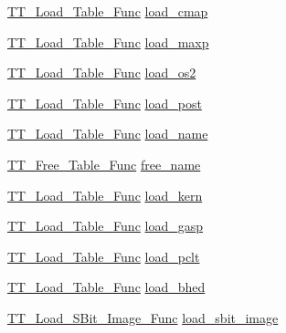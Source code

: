 \begin{DoxyCompactItemize}
\item 
\hyperlink{sfnt_8h_a91c8b8234760c9e3208e37c15cf1663c}{T\-T\-\_\-\-Load\-\_\-\-Table\-\_\-\-Func} \hyperlink{struct_s_f_n_t___interface___a3390e643937228ada5f1097c5598b851}{load\-\_\-cmap}
\item 
\hyperlink{sfnt_8h_a91c8b8234760c9e3208e37c15cf1663c}{T\-T\-\_\-\-Load\-\_\-\-Table\-\_\-\-Func} \hyperlink{struct_s_f_n_t___interface___a399c84ff5f64ebe022b0de02b474605f}{load\-\_\-maxp}
\item 
\hyperlink{sfnt_8h_a91c8b8234760c9e3208e37c15cf1663c}{T\-T\-\_\-\-Load\-\_\-\-Table\-\_\-\-Func} \hyperlink{struct_s_f_n_t___interface___a8976abd388072452e40dc7669c4882e2}{load\-\_\-os2}
\item 
\hyperlink{sfnt_8h_a91c8b8234760c9e3208e37c15cf1663c}{T\-T\-\_\-\-Load\-\_\-\-Table\-\_\-\-Func} \hyperlink{struct_s_f_n_t___interface___a9781e592014f8f3b55e5035ddadb0492}{load\-\_\-post}
\item 
\hyperlink{sfnt_8h_a91c8b8234760c9e3208e37c15cf1663c}{T\-T\-\_\-\-Load\-\_\-\-Table\-\_\-\-Func} \hyperlink{struct_s_f_n_t___interface___a139d44712b3fa1432cb76cfd07767312}{load\-\_\-name}
\item 
\hyperlink{sfnt_8h_a1dd1cdaed95812837450ce8579f2d076}{T\-T\-\_\-\-Free\-\_\-\-Table\-\_\-\-Func} \hyperlink{struct_s_f_n_t___interface___a158489e92faa08d1d8dc651da4e8f0d3}{free\-\_\-name}
\item 
\hyperlink{sfnt_8h_a91c8b8234760c9e3208e37c15cf1663c}{T\-T\-\_\-\-Load\-\_\-\-Table\-\_\-\-Func} \hyperlink{struct_s_f_n_t___interface___a351663c6b34807a9c0445498bf29f3d6}{load\-\_\-kern}
\item 
\hyperlink{sfnt_8h_a91c8b8234760c9e3208e37c15cf1663c}{T\-T\-\_\-\-Load\-\_\-\-Table\-\_\-\-Func} \hyperlink{struct_s_f_n_t___interface___a294bb9a099cd4a5594e52aa9f63d3e53}{load\-\_\-gasp}
\item 
\hyperlink{sfnt_8h_a91c8b8234760c9e3208e37c15cf1663c}{T\-T\-\_\-\-Load\-\_\-\-Table\-\_\-\-Func} \hyperlink{struct_s_f_n_t___interface___adfeb4667e09e03da5244fe5fd3f088e4}{load\-\_\-pclt}
\item 
\hyperlink{sfnt_8h_a91c8b8234760c9e3208e37c15cf1663c}{T\-T\-\_\-\-Load\-\_\-\-Table\-\_\-\-Func} \hyperlink{struct_s_f_n_t___interface___a4f1924327f1802067c4923e327ad5e46}{load\-\_\-bhed}
\item 
\hyperlink{sfnt_8h_a06cf515fe95586c2dfe8b05a1367bf1e}{T\-T\-\_\-\-Load\-\_\-\-S\-Bit\-\_\-\-Image\-\_\-\-Func} \hyperlink{struct_s_f_n_t___interface___ac0c68f047a4dbe7467ae422cd810e917}{load\-\_\-sbit\-\_\-image}

\end{DoxyCompactItemize}
